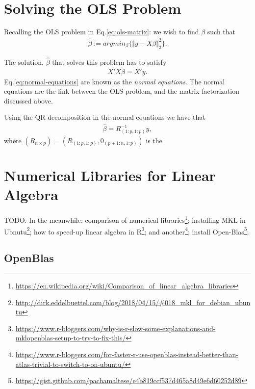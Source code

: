 \documentclass[]{book}
\renewcommand{\href}[2]{#2\footnote{\url{#1}}}
\theoremstyle{definition}
\theoremstyle{definition}
\theoremstyle{definition}
\theoremstyle{remark}
\begin{document}
\hypertarget{solving-ols}{%
\section{Solving the OLS Problem}\label{solving-ols}}

Recalling the OLS problem in Eq.\eqref{eq:ols-matrix}: we wish to find \(\beta\) such that\\
\begin{align}
  \hat \beta:= argmin_\beta \{ \Vert y-X\beta \Vert^2_2 \}.
\end{align}

The solution, \(\hat \beta\) that solves this problem has to satisfy
\begin{align}
  X'X \beta = X'y.
  \label{eq:normal-equations}
\end{align}
Eq.\eqref{eq:normal-equations} are known as the \emph{normal equations}.
The normal equations are the link between the OLS problem, and the matrix factorization discussed above.

Using the QR decomposition in the normal equations we have that
\begin{align*}
  \hat \beta = R_{(1:p,1:p)}^{-1} y,
\end{align*}
where \((R_{n\times p})=(R_{(1:p,1:p)},0_{(p+1:n,1:p)})\) is the

\hypertarget{numerical-libraries-for-linear-algebra}{%
\section{Numerical Libraries for Linear Algebra}\label{numerical-libraries-for-linear-algebra}}

TODO.
In the meanwhile:
\href{https://en.wikipedia.org/wiki/Comparison_of_linear_algebra_libraries}{comparison of numerical libraries};
\href{http://dirk.eddelbuettel.com/blog/2018/04/15/\#018_mkl_for_debian_ubuntu}{installing MKL in Ubnutu};
\href{https://www.r-bloggers.com/why-is-r-slow-some-explanations-and-mklopenblas-setup-to-try-to-fix-this/}{how to speed-up linear algebra in R};
\href{https://www.r-bloggers.com/for-faster-r-use-openblas-instead-better-than-atlas-trivial-to-switch-to-on-ubuntu/}{and another};
\href{https://gist.github.com/pachamaltese/e4b819ccf537d465a8d49e6d60252d89}{install Open-Blas};

\hypertarget{openblas}{%
\subsection{OpenBlas}\label{openblas}}
\end{document}
